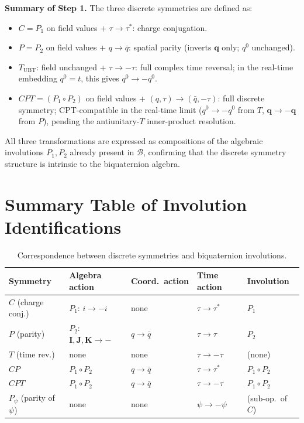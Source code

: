 \documentclass[12pt,a4paper]{article}
\theoremstyle{definition}
\theoremstyle{remark}
\begin{document}
\begin{resultbox}
\textbf{Summary of Step 1.}
The three discrete symmetries are defined as:
\begin{itemize}
  \item $C = P_1$ on field values + $\tau \to \tau^*$: charge conjugation.
  \item $P = P_2$ on field values + $q \to \bar{q}$: spatial parity
    (inverts $\mathbf{q}$ only; $q^0$ unchanged).
  \item $T_{\mathrm{UBT}}$: field unchanged + $\tau \to -\tau$:
    full complex time reversal; in the real-time embedding $q^0=t$,
    this gives $q^0 \to -q^0$.
  \item $CPT = (P_1 \circ P_2)$ on field values + $(q,\tau) \to (\bar{q},-\tau)$:
    full discrete symmetry; CPT-compatible in the real-time limit
    ($q^0 \to -q^0$ from $T$, $\mathbf{q} \to -\mathbf{q}$ from $P$),
    pending the antiunitary-$T$ inner-product resolution.
\end{itemize}
All three transformations are expressed as compositions of the algebraic
involutions $P_1, P_2$ already present in $\mathcal{B}$, confirming that the
discrete symmetry structure is intrinsic to the biquaternion algebra.
\end{resultbox}

\section{Summary Table of Involution Identifications}
\label{sec:sym:table}

\begin{table}[h]
\centering
\caption{Correspondence between discrete symmetries and biquaternion involutions.}
\label{tab:sym:involutions}
\begin{tabular}{@{}lllll@{}}
  \toprule
  Symmetry & Algebra action & Coord.\ action & Time action & Involution \\
  \midrule
  $C$ (charge conj.) & $P_1$: $i \to -i$ & none & $\tau \to \tau^*$ & $P_1$ \\
  $P$ (parity) & $P_2$: $\mathbf{I},\mathbf{J},\mathbf{K} \to -$ & $q \to \bar{q}$ & $\tau \to \tau$ & $P_2$ \\
  $T$ (time rev.) & none & none & $\tau \to -\tau$ & (none) \\
  $CP$ & $P_1 \circ P_2$ & $q \to \bar{q}$ & $\tau \to \tau^*$ & $P_1 \circ P_2$ \\
  $CPT$ & $P_1 \circ P_2$ & $q \to \bar{q}$ & $\tau \to -\tau$ & $P_1 \circ P_2$ \\
  $P_\psi$ (parity of $\psi$) & none & none & $\psi \to -\psi$ & (sub-op.\ of $C$) \\
  \bottomrule
\end{tabular}
\end{table}
\end{document}
